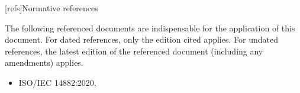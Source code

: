 
[refs]{Normative references}

\pnum
The following referenced documents are indispensable for the application of this
document. For dated references, only the edition cited applies. For undated
references, the latest edition of the referenced document (including any
amendments) applies.

\begin{itemize}
\item ISO/IEC 14882:2020, 
\end{itemize}


